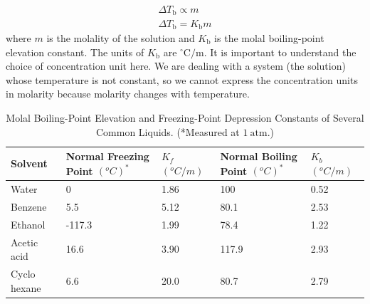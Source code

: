 \documentclass[a4paper,12pt,twocolumn]{article}
\begin{document}
\begin{itemize}
$$
\begin{gathered}
\Delta T_{\mathrm{b}} \propto m \\
\Delta T_{\mathrm{b}}=K_{\mathrm{b}} m
\end{gathered}
$$
where $m$ is the molality of the solution and $K_{\mathrm{b}}$ is the molal boiling-point elevation constant. The units of $K_{\mathrm{b}}$ are ${ }^{\circ} \mathrm{C} / \mathrm{m}$. It is important to understand the choice of concentration unit here. We are dealing with a system (the solution) whose temperature is not constant, so we cannot express the concentration units in molarity because molarity changes with temperature.
\end{itemize}

\begin{table}[h]
\centering
\def\arraystretch{1.5}
\begin{tabular}{|p{1.5cm}|p{1.4cm}|p{1.2cm}|p{1.4cm}|p{1.2cm}|}
\hline
Solvent &  Normal Freezing Point $({}^oC)^{*}$ & $K_f$ $({}^oC/m)$ & Normal Boiling Point $({}^oC)^{*}$ & $K_b$ $({}^oC/m)$\\
\hline Water & 0 & 1.86 & 100 & 0.52 \\ \hline
Benzene & 5.5 & 5.12 & 80.1 & 2.53 \\ \hline
Ethanol & -117.3 & 1.99 & 78.4 & 1.22 \\ \hline
Acetic acid & 16.6 & 3.90 & 117.9 & 2.93 \\ \hline
Cyclo hexane & 6.6 & 20.0 & 80.7 & 2.79\\ \hline
\end{tabular}
\caption{Molal Boiling-Point Elevation and Freezing-Point Depression Constants of Several Common Liquids. (*Measured at $1 \mathrm{~atm}$.)}
\end{table}
\end{document}
